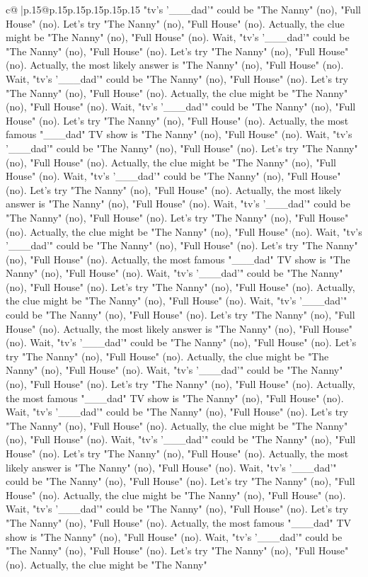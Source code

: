 \documentclass{article}
\begin{document}
{\begin{supertabular}{c@{$\;$}|p{.15\linewidth}@{}p{.15\linewidth}p{.15\linewidth}p{.15\linewidth}p{.15\linewidth}p{.15\linewidth}}
{{{"tv's '\_\_\_dad'" could be "The Nanny" (no), "Full House" (no). Let's try "The Nanny" (no), "Full House" (no). Actually, the clue might be "The Nanny" (no), "Full House" (no). Wait, "tv's '\_\_\_dad'" could be "The Nanny" (no), "Full House" (no). Let's try "The Nanny" (no), "Full House" (no). Actually, the most likely answer is "The Nanny" (no), "Full House" (no). Wait, "tv's '\_\_\_dad'" could be "The Nanny" (no), "Full House" (no). Let's try "The Nanny" (no), "Full House" (no). Actually, the clue might be "The Nanny" (no), "Full House" (no). Wait, "tv's '\_\_\_dad'" could be "The Nanny" (no), "Full House" (no). Let's try "The Nanny" (no), "Full House" (no). Actually, the most famous "\_\_\_dad" TV show is "The Nanny" (no), "Full House" (no). Wait, "tv's '\_\_\_dad'" could be "The Nanny" (no), "Full House" (no). Let's try "The Nanny" (no), "Full House" (no). Actually, the clue might be "The Nanny" (no), "Full House" (no). Wait, "tv's '\_\_\_dad'" could be "The Nanny" (no), "Full House" (no). Let's try "The Nanny" (no), "Full House" (no). Actually, the most likely answer is "The Nanny" (no), "Full House" (no). Wait, "tv's '\_\_\_dad'" could be "The Nanny" (no), "Full House" (no). Let's try "The Nanny" (no), "Full House" (no). Actually, the clue might be "The Nanny" (no), "Full House" (no). Wait, "tv's '\_\_\_dad'" could be "The Nanny" (no), "Full House" (no). Let's try "The Nanny" (no), "Full House" (no). Actually, the most famous "\_\_\_dad" TV show is "The Nanny" (no), "Full House" (no). Wait, "tv's '\_\_\_dad'" could be "The Nanny" (no), "Full House" (no). Let's try "The Nanny" (no), "Full House" (no). Actually, the clue might be "The Nanny" (no), "Full House" (no). Wait, "tv's '\_\_\_dad'" could be "The Nanny" (no), "Full House" (no). Let's try "The Nanny" (no), "Full House" (no). Actually, the most likely answer is "The Nanny" (no), "Full House" (no). Wait, "tv's '\_\_\_dad'" could be "The Nanny" (no), "Full House" (no). Let's try "The Nanny" (no), "Full House" (no). Actually, the clue might be "The Nanny" (no), "Full House" (no). Wait, "tv's '\_\_\_dad'" could be "The Nanny" (no), "Full House" (no). Let's try "The Nanny" (no), "Full House" (no). Actually, the most famous "\_\_\_dad" TV show is "The Nanny" (no), "Full House" (no). Wait, "tv's '\_\_\_dad'" could be "The Nanny" (no), "Full House" (no). Let's try "The Nanny" (no), "Full House" (no). Actually, the clue might be "The Nanny" (no), "Full House" (no). Wait, "tv's '\_\_\_dad'" could be "The Nanny" (no), "Full House" (no). Let's try "The Nanny" (no), "Full House" (no). Actually, the most likely answer is "The Nanny" (no), "Full House" (no). Wait, "tv's '\_\_\_dad'" could be "The Nanny" (no), "Full House" (no). Let's try "The Nanny" (no), "Full House" (no). Actually, the clue might be "The Nanny" (no), "Full House" (no). Wait, "tv's '\_\_\_dad'" could be "The Nanny" (no), "Full House" (no). Let's try "The Nanny" (no), "Full House" (no). Actually, the most famous "\_\_\_dad" TV show is "The Nanny" (no), "Full House" (no). Wait, "tv's '\_\_\_dad'" could be "The Nanny" (no), "Full House" (no). Let's try "The Nanny" (no), "Full House" (no). Actually, the clue might be "The Nanny" }}}
\end{supertabular}}
\end{document}
